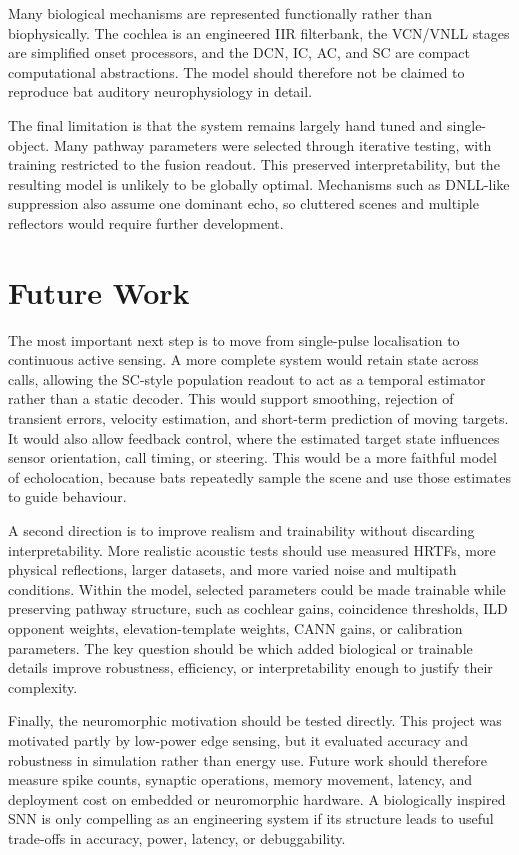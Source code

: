 Many biological mechanisms are represented functionally rather than biophysically. The cochlea is an engineered IIR filterbank, the VCN/VNLL stages are simplified onset processors, and the DCN, IC, AC, and SC are compact computational abstractions. The model should therefore not be claimed to reproduce bat auditory neurophysiology in detail.

The final limitation is that the system remains largely hand tuned and single-object. Many pathway parameters were selected through iterative testing, with training restricted to the fusion readout. This preserved interpretability, but the resulting model is unlikely to be globally optimal. Mechanisms such as DNLL-like suppression also assume one dominant echo, so cluttered scenes and multiple reflectors would require further development.

\section{Future Work}

The most important next step is to move from single-pulse localisation to continuous active sensing. A more complete system would retain state across calls, allowing the SC-style population readout to act as a temporal estimator rather than a static decoder. This would support smoothing, rejection of transient errors, velocity estimation, and short-term prediction of moving targets. It would also allow feedback control, where the estimated target state influences sensor orientation, call timing, or steering. This would be a more faithful model of echolocation, because bats repeatedly sample the scene and use those estimates to guide behaviour.

A second direction is to improve realism and trainability without discarding interpretability. More realistic acoustic tests should use measured HRTFs, more physical reflections, larger datasets, and more varied noise and multipath conditions. Within the model, selected parameters could be made trainable while preserving pathway structure, such as cochlear gains, coincidence thresholds, ILD opponent weights, elevation-template weights, CANN gains, or calibration parameters. The key question should be which added biological or trainable details improve robustness, efficiency, or interpretability enough to justify their complexity.

Finally, the neuromorphic motivation should be tested directly. This project was motivated partly by low-power edge sensing, but it evaluated accuracy and robustness in simulation rather than energy use. Future work should therefore measure spike counts, synaptic operations, memory movement, latency, and deployment cost on embedded or neuromorphic hardware. A biologically inspired SNN is only compelling as an engineering system if its structure leads to useful trade-offs in accuracy, power, latency, or debuggability.

